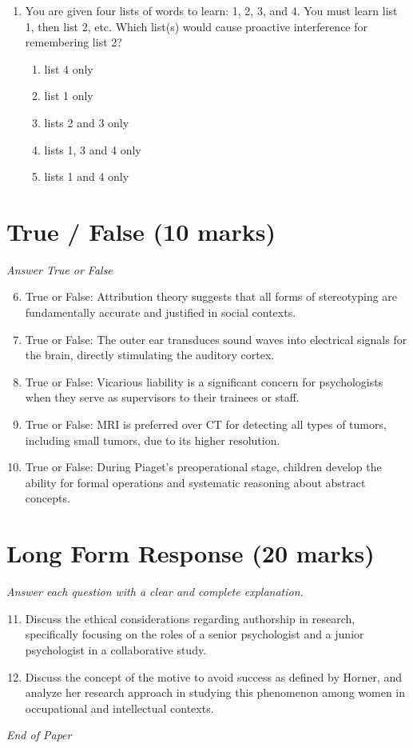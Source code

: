\documentclass[12pt]{article}
\begin{document}
\begin{enumerate}[label=\arabic*.]
\begin{enumerate}[label=(\alph*)]
    \item Working memory
    \item Episodic memory
\end{enumerate}
\item You are given four lists of words to learn: 1, 2, 3, and 4. You must learn list 1, then list 2, etc. Which list(s) would cause proactive interference for remembering list 2?
\begin{enumerate}[label=(\alph*)]
    \item list 4 only
    \item list 1 only
    \item lists 2 and 3 only
    \item lists 1, 3 and 4 only
    \item lists 1 and 4 only
\end{enumerate}
\end{enumerate}

\section*{True / False (10 marks)}
\textit{Answer True or False}
\begin{enumerate}[label=\arabic*.]
\setcounter{enumi}{5}
\item True or False: Attribution theory suggests that all forms of stereotyping are fundamentally accurate and justified in social contexts.
\item True or False: The outer ear transduces sound waves into electrical signals for the brain, directly stimulating the auditory cortex.
\item True or False: Vicarious liability is a significant concern for psychologists when they serve as supervisors to their trainees or staff.
\item True or False: MRI is preferred over CT for detecting all types of tumors, including small tumors, due to its higher resolution.
\item True or False: During Piaget's preoperational stage, children develop the ability for formal operations and systematic reasoning about abstract concepts.
\end{enumerate}

\section*{Long Form Response (20 marks)}
\textit{Answer each question with a clear and complete explanation.}
\begin{enumerate}[label=\arabic*.]
\setcounter{enumi}{10}
\item Discuss the ethical considerations regarding authorship in research, specifically focusing on the roles of a senior psychologist and a junior psychologist in a collaborative study.
\item Discuss the concept of the motive to avoid success as defined by Horner, and analyze her research approach in studying this phenomenon among women in occupational and intellectual contexts.
\end{enumerate}

\vfill
\noindent\textit{End of Paper}
\end{document}
